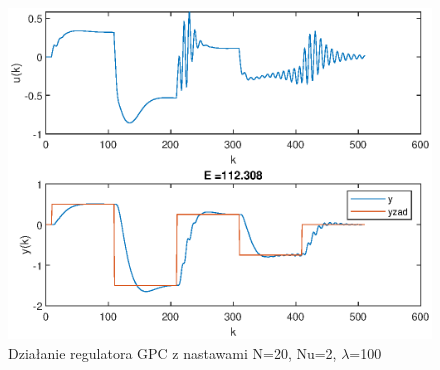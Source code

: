 		\begin{figure}[h!]
			\centering
			\includegraphics[width=\linewidth]{img/GPC100.eps}
			\caption{Działanie regulatora GPC z nastawami N=20, Nu=2, $\lambda$=100}
			\label{fig:GPC100}
		\end{figure}